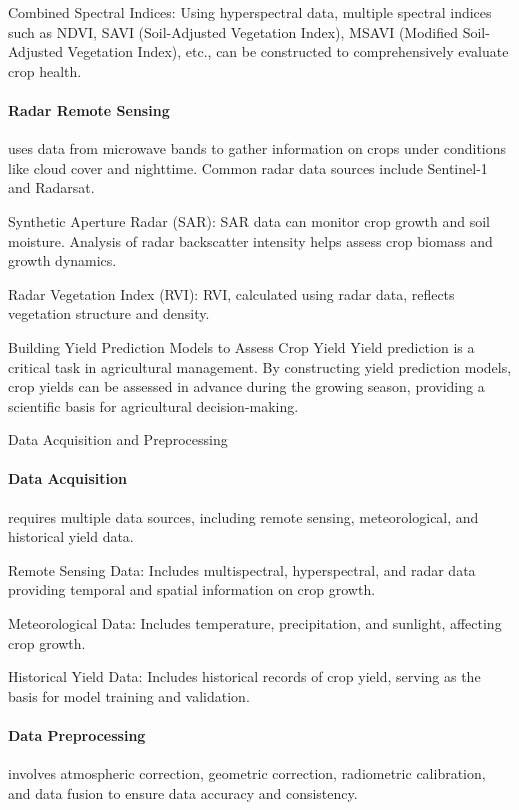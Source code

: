 Combined Spectral Indices: Using hyperspectral data, multiple spectral indices such as NDVI, SAVI (Soil-Adjusted Vegetation Index), MSAVI (Modified Soil-Adjusted Vegetation Index), etc., can be constructed to comprehensively evaluate crop health.

\paragraph*{Radar Remote Sensing} uses data from microwave bands to gather information on crops under conditions like cloud cover and nighttime. Common radar data sources include Sentinel-1 and Radarsat.

Synthetic Aperture Radar (SAR): SAR data can monitor crop growth and soil moisture. Analysis of radar backscatter intensity helps assess crop biomass and growth dynamics.

Radar Vegetation Index (RVI): RVI, calculated using radar data, reflects vegetation structure and density.

Building Yield Prediction Models to Assess Crop Yield
Yield prediction is a critical task in agricultural management. By constructing yield prediction models, crop yields can be assessed in advance during the growing season, providing a scientific basis for agricultural decision-making\cite{sahooHyperspectralRemoteSensing2015}.

Data Acquisition and Preprocessing
\paragraph*{Data Acquisition} requires multiple data sources, including remote sensing, meteorological, and historical yield data.

Remote Sensing Data: Includes multispectral, hyperspectral, and radar data providing temporal and spatial information on crop growth.

Meteorological Data: Includes temperature, precipitation, and sunlight, affecting crop growth.

Historical Yield Data: Includes historical records of crop yield, serving as the basis for model training and validation.

\paragraph*{Data Preprocessing} involves atmospheric correction, geometric correction, radiometric calibration, and data fusion to ensure data accuracy and consistency.

